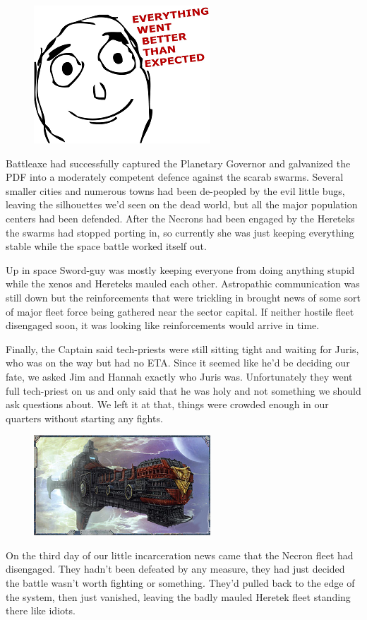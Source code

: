 \begin{figure}
	\begin{center}
		\includegraphics[width=\figwidth]{pics/11/95.png}
	\end{center}
\end{figure}
Battleaxe had successfully captured the Planetary Governor and galvanized the PDF into a moderately competent defence against the scarab swarms. 
Several smaller cities and numerous towns had been de-peopled by the evil little bugs, leaving the silhouettes we'd seen on the dead world, but all the major population centers had been defended. 
After the Necrons had been engaged by the Hereteks the swarms had stopped porting in, so currently she was just keeping everything stable while the space battle worked itself out.

Up in space Sword-guy was mostly keeping everyone from doing anything stupid while the xenos and Hereteks mauled each other. 
Astropathic communication was still down but the reinforcements that were trickling in brought news of some sort of major fleet force being gathered near the sector capital. 
If neither hostile fleet disengaged soon, it was looking like reinforcements would arrive in time.

Finally, the Captain said tech-priests were still sitting tight and waiting for Juris, who was on the way but had no ETA. 
Since it seemed like he'd be deciding our fate, we asked Jim and Hannah exactly who Juris was. 
Unfortunately they went full tech-priest on us and only said that he was holy and not something we should ask questions about. 
We left it at that, things were crowded enough in our quarters without starting any fights.

\begin{figure}
	\begin{center}
		\includegraphics[width=\figwidth]{pics/11/96.png}
	\end{center}
\end{figure}
On the third day of our little incarceration news came that the Necron fleet had disengaged. 
They hadn't been defeated by any measure, they had just decided the battle wasn't worth fighting or something. 
They'd pulled back to the edge of the system, then just vanished, leaving the badly mauled Heretek fleet standing there like idiots.

